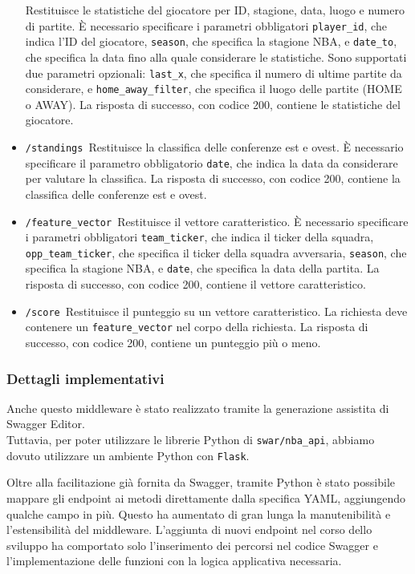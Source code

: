 \begin{itemize}
    Restituisce le statistiche del giocatore per ID, stagione, data, luogo e numero di partite. È necessario specificare i parametri obbligatori \texttt{player\_id}, che indica l'ID del giocatore, \texttt{season}, che specifica la stagione NBA, e \texttt{date\_to}, che specifica la data fino alla quale considerare le statistiche. Sono supportati due parametri opzionali: \texttt{last\_x}, che specifica il numero di ultime partite da considerare, e \texttt{home\_away\_filter}, che specifica il luogo delle partite (HOME o AWAY). La risposta di successo, con codice 200, contiene le statistiche del giocatore.
    \item \texttt{/standings}\
    Restituisce la classifica delle conferenze est e ovest. È necessario specificare il parametro obbligatorio \texttt{date}, che indica la data da considerare per valutare la classifica. La risposta di successo, con codice 200, contiene la classifica delle conferenze est e ovest.
    \item \texttt{/feature\_vector}\
    Restituisce il vettore caratteristico. È necessario specificare i parametri obbligatori \texttt{team\_ticker}, che indica il ticker della squadra, \texttt{opp\_team\_ticker}, che specifica il ticker della squadra avversaria, \texttt{season}, che specifica la stagione NBA, e \texttt{date}, che specifica la data della partita. La risposta di successo, con codice 200, contiene il vettore caratteristico.
    \item \texttt{/score}\
    Restituisce il punteggio su un vettore caratteristico. La richiesta deve contenere un \texttt{feature\_vector} nel corpo della richiesta. La risposta di successo, con codice 200, contiene un punteggio più o meno.
\end{itemize}


\subsubsection{Dettagli implementativi}
Anche questo middleware è stato realizzato tramite la generazione assistita di Swagger Editor.\\
Tuttavia, per poter utilizzare le librerie Python di \texttt{swar/nba\_api}, abbiamo dovuto utilizzare un ambiente Python con \texttt{Flask}. 


Oltre alla facilitazione già fornita da Swagger, tramite Python è stato possibile mappare gli endpoint ai metodi direttamente dalla specifica YAML, aggiungendo qualche campo in più. Questo ha aumentato di gran lunga la manutenibilità e l'estensibilità del middleware. L'aggiunta di nuovi endpoint nel corso dello sviluppo ha comportato solo l'inserimento dei percorsi nel codice Swagger e l'implementazione delle funzioni con la logica applicativa necessaria.

